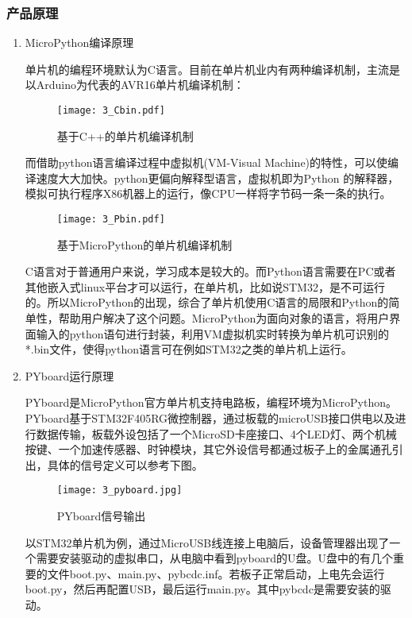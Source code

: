 \subsubsection{产品原理}
\begin{enumerate}[(1)]
\item MicroPython编译原理

      单片机的编程环境默认为C语言。目前在单片机业内有两种编译机制，主流是以Arduino为代表的AVR16单片机编译机制：

     \begin{figure}[H]
     \centering
     \texttt{[image: 3\_Cbin.pdf]}
     \caption{基于C++的单片机编译机制}
     \label{基于C++的单片机编译机制}
     \end{figure}

     而借助python语言编译过程中虚拟机(VM-Visual Machine)的特性，可以使编译速度大大加快。python更偏向解释型语言，虚拟机即为Python 的解释器，模拟可执行程序X86机器上的运行，像CPU一样将字节码一条一条的执行。

      \begin{figure}[H]
      \centering
      \texttt{[image: 3\_Pbin.pdf]}
      \caption{基于MicroPython的单片机编译机制}
      \label{基于MicroPython的单片机编译机制}
      \end{figure}

      C语言对于普通用户来说，学习成本是较大的。而Python语言需要在PC或者其他嵌入式linux平台才可以运行，在单片机，比如说STM32，是不可运行的。所以MicroPython的出现，综合了单片机使用C语言的局限和Python的简单性，帮助用户解决了这个问题。MicroPython为面向对象的语言，将用户界面输入的python语句进行封装，利用VM虚拟机实时转换为单片机可识别的*.bin文件，使得python语言可在例如STM32之类的单片机上运行。
      
\item PYboard运行原理

      PYboard是MicroPython官方单片机支持电路板，编程环境为MicroPython。PYboard基于STM32F405RG微控制器，通过板载的microUSB接口供电以及进行数据传输，板载外设包括了一个MicroSD卡座接口、4个LED灯、两个机械按键、一个加速传感器、时钟模块，其它外设信号都通过板子上的金属通孔引出，具体的信号定义可以参考下图。
      
      \begin{figure}[H]
      \centering
      \texttt{[image: 3\_pyboard.jpg]}
      \caption{PYboard信号输出}
      \label{PYboard信号输出}
      \end{figure}
      
      以STM32单片机为例，通过MicroUSB线连接上电脑后，设备管理器出现了一个需要安装驱动的虚拟串口，从电脑中看到pyboard的U盘。U盘中的有几个重要的文件boot.py、main.py、pybcdc.inf。若板子正常启动，上电先会运行boot.py，然后再配置USB，最后运行main.py。其中pybcdc是需要安装的驱动。
      

\end{enumerate}
